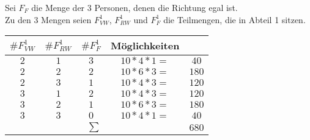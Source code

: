\documentclass[a4paper, 12pt]{article} %
\begin{document}
Sei $F_{F}$ die Menge der 3 Personen, denen die Richtung egal ist. \\
Zu den 3 Mengen seien $F_{VW}^1$, $F_{RW}^1$ und $F_{F}^1$ die Teilmengen, die in Abteil 1 sitzen. \\[1ex]
\begin{tabular}{|c|c|c|cc|}
\hline
$\#F_{VW}^1$ 	&	$\#F_{RW}^1$ 	&	$\#F_{F}^1$ 	&	Möglichkeiten 	& \\ \hline \hline
$2$ & $1$ & $3$ & $10*4*1 = $ & $40$\\ \hline
$2$ & $2$ & $2$ & $10*6*3 = $ & $180$\\ \hline
$2$ & $3$ & $1$ & $10*4*3 = $ & $120$\\ \hline
$3$ & $1$ & $2$ & $10*4*3 = $ & $120$\\ \hline
$3$ & $2$ & $1$ & $10*6*3 = $ & $180$\\ \hline
$3$ & $3$ & $0$ & $10*4*1 = $ & $40$\\ \hline \hline
\multicolumn{3}{|r|}{$\sum$} & & $680$ \\ \hline
\end{tabular}
\end{document}
